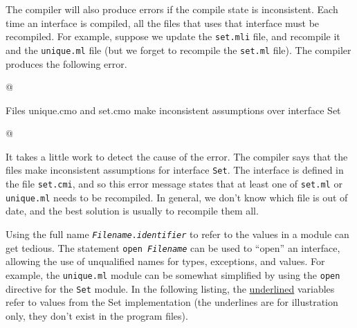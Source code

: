 
The compiler will also produce errors if the compile state is
inconsistent. Each time an interface is compiled, all the files that
uses that interface must be recompiled.  For example, suppose we update
the \hbox{\lstinline/set.mli/} file, and recompile it and
the \hbox{\lstinline/unique.ml/} file (but we forget to recompile
the \hbox{\lstinline/set.ml/} file). The compiler produces the
following error.

\begin{ocaml}
@
\begin{toperror}
Files unique.cmo and set.cmo make inconsistent
assumptions over interface Set
\end{toperror}
@
\end{ocaml}
%
It takes a little work to detect the cause of the error. The compiler
says that the files make inconsistent assumptions for
interface \hbox{\lstinline/Set/}. The interface is defined in the
file \hbox{\lstinline/set.cmi/}, and so this error message states that
at least one of \hbox{\lstinline/set.ml/}
or \hbox{\lstinline/unique.ml/} needs to be recompiled. In general, we
don't know which file is out of date, and the best solution is usually
to recompile them all.


\label{keyword:open}
Using the full name \texttt{\emph{Filename}.\emph{identifier}} to refer to
the values in a module can get
tedious. The statement \texttt{open \emph{Filename}} can be used to
``open'' an interface, allowing the use of unqualified names for
types, exceptions, and values. For example,
the \hbox{\lstinline/unique.ml/} module can be somewhat simplified by
using the \hbox{\lstinline/open/} directive for
the \hbox{\lstinline/Set/} module. In the following listing,
the \underline{underlined} variables refer to values from the Set
implementation (the underlines are for illustration only, they don't
exist in the program files).

